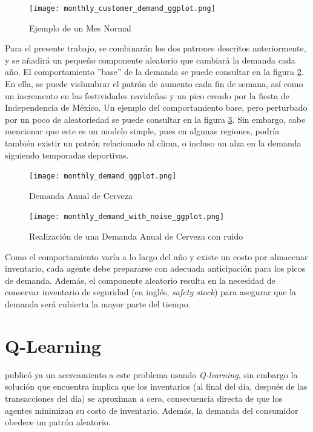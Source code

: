 \begin{figure}[ht!]
\caption{Ejemplo de un Mes Normal}
\label{weekly_base}
\texttt{[image: monthly\_customer\_demand\_ggplot.png]}
\centering
\end{figure}

Para el presente trabajo, se combinar\'an los dos patrones descritos anteriormente, y se a\~nadir\'a un peque\~no componente aleatorio que cambiar\'a la demanda cada a\~no. El comportamiento ''base'' de la demanda se puede consultar en la figura \ref{yearly_base}. En ella, se puede vislumbrar el patr\'on de aumento cada fin de semana, as\'i como un incremento en las festividades navide\~nas y un pico creado por la fiesta de Independencia de M\'exico. Un ejemplo del comportamiento base, pero perturbado por un poco de aleatoriedad se puede consultar en la figura \ref{yearly_base_noisy}. Sin embargo, cabe mencionar que este es un modelo simple, pues en algunas regiones, podr\'ia tambi\'en existir un patr\'on relacionado al clima, o incluso un alza en la demanda siguiendo temporadas deportivas. \\

\begin{figure}[ht!]
\caption{Demanda Anual de Cerveza}
\label{yearly_base}
\texttt{[image: monthly\_demand\_ggplot.png]}
\centering
\end{figure}

\begin{figure}[ht!]
\caption{Realizaci\'on de una Demanda Anual de Cerveza con ruido }
\label{yearly_base_noisy}
\texttt{[image: monthly\_demand\_with\_noise\_ggplot.png]}
\centering
\end{figure}

Como el comportamiento var\'ia a lo largo del a\~no y existe un costo por almacenar inventario, cada agente debe prepararse con adecuada anticipaci\'on para los picos de demanda. Adem\'as, el componente aleatorio resulta en la necesidad de conservar inventario de seguridad (en ingl\'es, \textit{safety stock}) para asegurar que la demanda ser\'a cubierta la mayor parte del tiempo.

\section{Q-Learning}

\citet{Chaharsooghi} public\'o ya un acercamiento a este problema usando \textit{Q-learning}, sin embargo la soluci\'on que encuentra implica que los inventarios (al final del d\'ia, despu\'es de las transacciones del d\'ia) se aproximan a cero, consecuencia directa de que los agentes minimizan su costo de inventario. Adem\'as, la demanda del consumidor obedece un patr\'on aleatorio.\\

